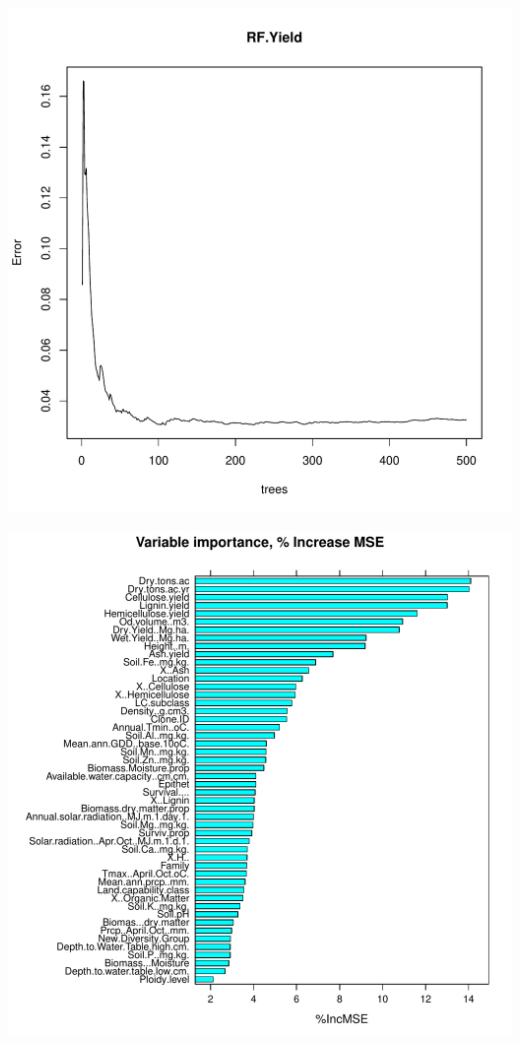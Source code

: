 \documentclass{article}\usepackage[]{graphicx}\usepackage[]{color}
\makeatletter
\def\maxwidth{ %
  \ifdim\Gin@nat@width>\linewidth
    \linewidth
  \else
    \Gin@nat@width
  \fi
}
\newenvironment{knitrout}{}{} %
\makeatother
\begin{document}
\begin{knitrout}
\color{fgcolor}

{\centering \includegraphics[width=\maxwidth]{figure/BruteForceApproach-1} 

}




{\centering \includegraphics[width=\maxwidth]{figure/BruteForceApproach-2} 

}
\end{knitrout}
\end{document}
